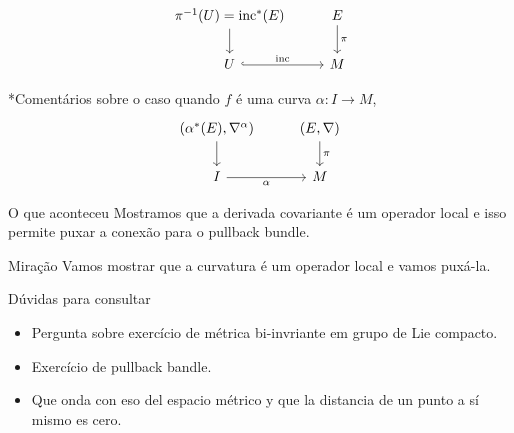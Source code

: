 \begin{example}\leavevmode
\[\begin{tikzcd}
	\pi^{-1}(U)=\text{inc}^* (E)\arrow[d]&E\arrow[d,"\pi"]\\
	U\arrow[r,hook,"\text{inc}"]&M
\end{tikzcd}\]
\end{example}
\begin{remark}\leavevmode
*Comentários sobre o caso quando \(f\) é uma curva \(\alpha:I \to M\),
\[\begin{tikzcd}
	(\alpha ^* (E),\nabla^\alpha)\arrow[d]& (E,\nabla)\arrow[d,"\pi"]\\I\arrow[r,"\alpha",swap]&M
\end{tikzcd}\]
\end{remark}

\begin{thing8}{O que aconteceu}\leavevmode
Mostramos que a derivada covariante é um operador local e isso permite puxar a conexão para o pullback bundle.
\end{thing8}

\begin{thing9}{Miração}\leavevmode
Vamos mostrar que a curvatura é um operador local e vamos puxá-la.
\end{thing9}

\begin{thing8}{Dúvidas para consultar}\leavevmode
\begin{itemize}
\item Pergunta sobre exercício de métrica bi-invriante em grupo de Lie compacto.
\item Exercício de pullback bandle.
\item Que onda con eso del espacio métrico y que la distancia de un punto a sí mismo es cero.
\end{itemize}
\end{thing8}

\clearpage

